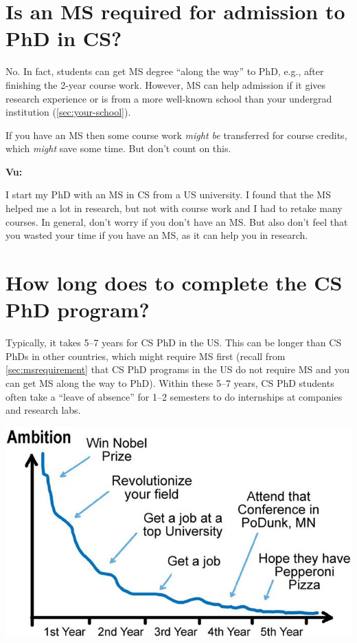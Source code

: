 \documentclass[oneside,11pt,dvipsnames]{book}
\newenvironment{commentbox}[1][]{
  \small
  \begin{mybox}
    {\small \textbf{#1}}
  }{
  \end{mybox}
}
\begin{document}
\section{Is an MS required for admission to PhD in CS?}\label{sec:msrequirement}
No. In fact, students can get MS degree ``along the way'' to PhD, e.g., after finishing the 2-year course work.  However, MS can help admission if it gives research experience or is from a more well-known school than your undergrad institution (\autoref{sec:your-school}).

If you have an MS then some course work \emph{might be} transferred for course credits, which \emph{might} save some time. But don't count on this.

\begin{commentbox}[Vu:]
    I start my PhD with an MS in CS from a US university.  I found that the MS helped me a lot in research, but not with course work and I had to retake many courses.  In general, don't worry if you don't have an MS. But also don't feel that you wasted your time if you have an MS, as it can help you in research.
  \end{commentbox}


\section{How long does to complete the CS PhD program?}\label{sec:time}




Typically, it takes 5--7 years for CS PhD in the US.  This can be longer than CS PhDs in other countries, which might require MS first (recall from \autoref{sec:msrequirement} that CS PhD programs in the US do not require MS and you can get MS along the way to PhD). Within these 5--7 years, CS PhD students often take a ``leave of absence'' for 1--2 semesters to do internships at companies and research labs.


\begin{center}
  \includegraphics[scale=0.5]{files/c4a.png}
\end{center}
\end{document}
